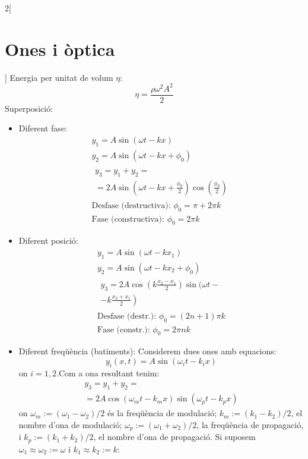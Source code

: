 \documentclass[class=article,10pt,crop=false]{standalone}
\begin{document}
\begin{multicols}{2}[\section{Ones i òptica}]
Energia per unitat de volum $\eta$:
$$\eta=\frac{\rho\omega^2A^2}{2}$$
Superposició:
\begin{itemize}
    \item Diferent fase:
    \begin{gather*}
        y_1=A\sin(\omega t- kx)\\
        y_2=A\sin(\omega t- kx+\phi_0)\\
        \begin{split}
            y_3=y_1+y_2=\qquad\qquad\qquad\qquad\\=2A\sin\left(\omega t-kx+\frac{\phi_0}{2}\right)\cos\left(\frac{\phi_0}{2}\right)
        \end{split}\\
        \text{Desfase (destructiva): }\phi_0=\pi+2\pi k\\
        \text{Fase (constructiva): }\phi_0=2\pi k
    \end{gather*}
    \item Diferent posició:
    \begin{gather*}
        y_1=A\sin(\omega t- kx_1)\\
        y_2=A\sin(\omega t- kx_2+\phi_0)\\
        \begin{split}
        y_3=2A\cos\left(k\frac{x_2-x_1}{2}\right)\sin\bigg(\omega t-\\\left.-k\frac{x_2+x_1}{2}\right)
        \end{split}\\
        \text{Desfase (destr.): }\phi_0=(2n+1)\pi k\\
        \text{Fase (constr.): }\phi_0=2\pi nk
    \end{gather*}
    \item Diferent freqüència (batiments):\newline
    Considerem dues ones amb equacions: $$y_i(x,t)=A\sin(\omega_it-k_ix)$$ {\footnotesize on $i=1,2$.}\newline Com a ona resultant tenim:
    \begin{multline*}
        y_3=y_1+y_2=\\=2A\cos(\omega_mt-k_mx)\sin(\omega_pt-k_px) 
    \end{multline*}{\footnotesize on $\omega_m:=(\omega_1-\omega_2)/2$ és la freqüència de modulació; $k_m:=(k_1-k_2)/2$, el nombre d'ona de modulació; $\omega_p:=(\omega_1+\omega_2)/2$, la freqüència de propagació, i $k_p:=(k_1+k_2)/2$, el nombre d'ona de propagació.}\newline
    Si suposem $\omega_1\approx\omega_2:=\omega$ i $k_1\approx k_2:=k$:\newline

\end{itemize}
\end{multicols}
\end{document}
